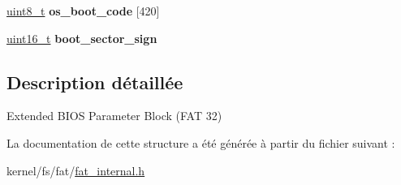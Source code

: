 \begin{DoxyCompactItemize}
\item 
\hypertarget{struct__fat__extended__BIOS__32_ac163d55b696ec5e32d9d74482d6abe38}{\hyperlink{kernel_2include_2types_8h_aba7bc1797add20fe3efdf37ced1182c5}{uint8\+\_\+t} {\bfseries os\+\_\+boot\+\_\+code} \mbox{[}420\mbox{]}}\label{struct__fat__extended__BIOS__32_ac163d55b696ec5e32d9d74482d6abe38}

\item 
\hypertarget{struct__fat__extended__BIOS__32_a2cc6336683f3694723e4118983960174}{\hyperlink{kernel_2include_2types_8h_adf4d876453337156dde61095e1f20223}{uint16\+\_\+t} {\bfseries boot\+\_\+sector\+\_\+sign}}\label{struct__fat__extended__BIOS__32_a2cc6336683f3694723e4118983960174}

\end{DoxyCompactItemize}


\subsection{Description détaillée}
Extended B\+I\+O\+S Parameter Block (F\+A\+T 32) 

La documentation de cette structure a été générée à partir du fichier suivant \+:\begin{DoxyCompactItemize}
\item 
kernel/fs/fat/\hyperlink{fat__internal_8h}{fat\+\_\+internal.\+h}\end{DoxyCompactItemize}
